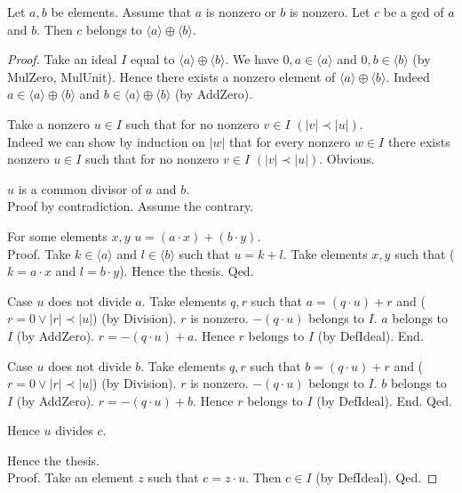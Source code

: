 \documentclass{article}
\begin{document}
  \begin{forthel}
    \begin{theorem}[GCDin]
      Let $a,b$ be elements.
      Assume that $a$ is nonzero or $b$ is nonzero.
      Let $c$ be a gcd of $a$ and $b$.
      Then $c$ belongs to $\langle a \rangle \oplus \langle b \rangle$.
    \end{theorem}
    \begin{proof}
      Take an ideal $I$ equal to $\langle a \rangle \oplus \langle b \rangle$.
      We have $0,a \in \langle a \rangle$ and $0,b \in \langle b \rangle$
      (by MulZero, MulUnit).
      Hence there exists a nonzero element of
      $\langle a \rangle \oplus \langle b \rangle$.
      Indeed $a \in \langle a \rangle \oplus \langle b \rangle$ and
      $b \in \langle a \rangle \oplus \langle b \rangle$ (by AddZero).

      Take a nonzero $u \in I$ such that for no nonzero
      $v \in I$ $(|v| \prec |u|)$. \\
      Indeed we can show by induction on $|w|$ that for every nonzero $w \in I$
      there exists nonzero $u \in I$ such that for no nonzero
      $v \in I$ $(|v| \prec |u|)$.
      Obvious.

      $u$ is a common divisor of $a$ and $b$. \\
      Proof by contradiction.
        Assume the contrary.

        For some elements $x,y$ $u = (a \cdot x) + (b \cdot y)$. \\
        Proof.
          Take $k \in \langle a \rangle$ and $l \in \langle b \rangle$ such that
          $u = k + l$.
          Take elements $x,y$ such that ($k = a \cdot x$ and $l = b \cdot y$).
          Hence the thesis.
        Qed.

        Case $u$ does not divide $a$.
          Take elements $q,r$ such that $a = (q \cdot u) + r$ and
          ($r = 0 \vee |r| \prec |u|$) (by Division).
          $r$ is nonzero.
          $-(q \cdot u)$ belongs to $I$.
          $a$ belongs to $I$ (by AddZero).
          $r = - (q \cdot u) + a$.
          Hence $r$ belongs to $I$ (by DefIdeal).
        End.

        Case $u$ does not divide $b$.
          Take elements $q,r$ such that $b = (q \cdot u) + r$ and
          ($r = 0 \vee |r| \prec |u|$) (by Division).
          $r$ is nonzero.
          $-(q \cdot u)$ belongs to $I$.
          $b$ belongs to $I$ (by AddZero).
          $r = - (q \cdot u) + b$.
          Hence $r$ belongs to $I$ (by DefIdeal).
        End.
      Qed.

      Hence $u$ divides $c$.

      Hence the thesis. \\
      Proof.
        Take an element $z$ such that $c = z \cdot u$.
        Then $c \in I$ (by DefIdeal).
      Qed.
    \end{proof}
  \end{forthel}
\end{document}
